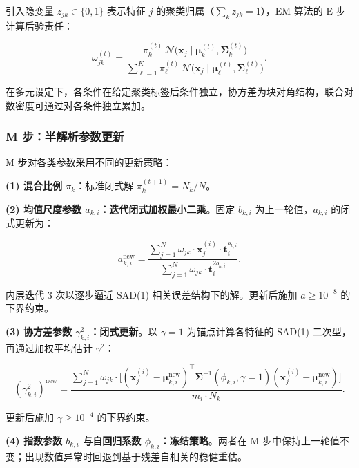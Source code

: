 \documentclass[12pt,a4paper]{article}
\begin{document}
引入隐变量 $z_{jk} \in \{0, 1\}$ 表示特征 $j$ 的聚类归属（$\sum_k z_{jk} = 1$），EM 算法的 E 步计算后验责任：

\begin{equation}\label{eq:resp}
    \omega_{jk}^{(t)} = \frac{\pi_k^{(t)} \,
        \mathcal{N}\bigl(\bm{x}_j \mid \bm{\mu}_k^{(t)}, \bm{\Sigma}_k^{(t)}\bigr)}
        {\sum_{\ell=1}^{K} \pi_\ell^{(t)} \,
        \mathcal{N}\bigl(\bm{x}_j \mid \bm{\mu}_\ell^{(t)}, \bm{\Sigma}_\ell^{(t)}\bigr)}.
\end{equation}

在多元设定下，各条件在给定聚类标签后条件独立，协方差为块对角结构，联合对数密度可通过对各条件独立累加。

\subsubsection{M 步：半解析参数更新}

M 步对各类参数采用不同的更新策略：

\textbf{(1) 混合比例 $\pi_k$}：标准闭式解 $\pi_k^{(t+1)} = N_k/N$。

\textbf{(2) 均值尺度参数 $a_{k,i}$：迭代闭式加权最小二乘}。固定 $b_{k,i}$ 为上一轮值，$a_{k,i}$ 的闭式更新为：

\begin{equation}\label{eq:a_update}
    a_{k,i}^{\text{new}} =
    \frac{\sum_{j=1}^{N} \omega_{jk} \cdot \bm{x}_j^{(i)} \cdot \bm{t}_i^{b_{k,i}}}
         {\sum_{j=1}^{N} \omega_{jk} \cdot \bm{t}_i^{2b_{k,i}}}.
\end{equation}

内层迭代 3 次以逐步逼近 SAD(1) 相关误差结构下的解。更新后施加 $a \geq 10^{-8}$ 的下界约束。

\textbf{(3) 协方差参数 $\gamma_{k,i}^2$：闭式更新}。以 $\gamma = 1$ 为锚点计算各特征的 SAD(1) 二次型，再通过加权平均估计 $\gamma^2$：

\begin{equation}\label{eq:gamma_update}
    (\gamma_{k,i}^2)^{\text{new}} =
    \frac{\sum_{j=1}^{N} \omega_{jk} \cdot
        \bigl[ (\bm{x}_j^{(i)} - \bm{\mu}_{k,i}^{\text{new}})^\top
               \bm{\Sigma}^{-1}(\phi_{k,i}, \gamma=1)
               (\bm{x}_j^{(i)} - \bm{\mu}_{k,i}^{\text{new}}) \bigr]}
         {m_i \cdot N_k}.
\end{equation}

更新后施加 $\gamma \geq 10^{-4}$ 的下界约束。

\textbf{(4) 指数参数 $b_{k,i}$ 与自回归系数 $\phi_{k,i}$：冻结策略}。两者在 M 步中保持上一轮值不变；出现数值异常时回退到基于残差自相关的稳健重估。
\end{document}
